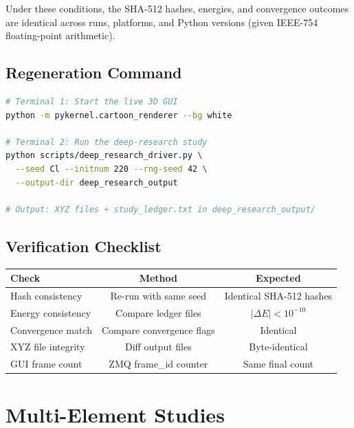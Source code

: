 \documentclass[11pt,a4paper]{article}
\begin{document}
\noindent Under these conditions, the SHA-512 hashes, energies, and
convergence outcomes are identical across runs, platforms, and Python
versions (given IEEE-754 floating-point arithmetic).

\subsection{Regeneration Command}

\begin{lstlisting}[language=bash,title={\textbf{Reproduce the Cl study}}]
# Terminal 1: Start the live 3D GUI
python -m pykernel.cartoon_renderer --bg white

# Terminal 2: Run the deep-research study
python scripts/deep_research_driver.py \
  --seed Cl --initnum 220 --rng-seed 42 \
  --output-dir deep_research_output

# Output: XYZ files + study_ledger.txt in deep_research_output/
\end{lstlisting}

\subsection{Verification Checklist}

\begin{center}
\begin{tabular}{lcc}
\toprule
\textbf{Check} & \textbf{Method} & \textbf{Expected} \\
\midrule
Hash consistency     & Re-run with same seed & Identical SHA-512 hashes \\
Energy consistency   & Compare ledger files   & $|\Delta E| < 10^{-10}$ \\
Convergence match    & Compare convergence flags & Identical \\
XYZ file integrity   & Diff output files     & Byte-identical \\
GUI frame count      & ZMQ frame\_id counter  & Same final count \\
\bottomrule
\end{tabular}
\end{center}

\section{Multi-Element Studies}
\label{sec:multi_element}
\end{document}
